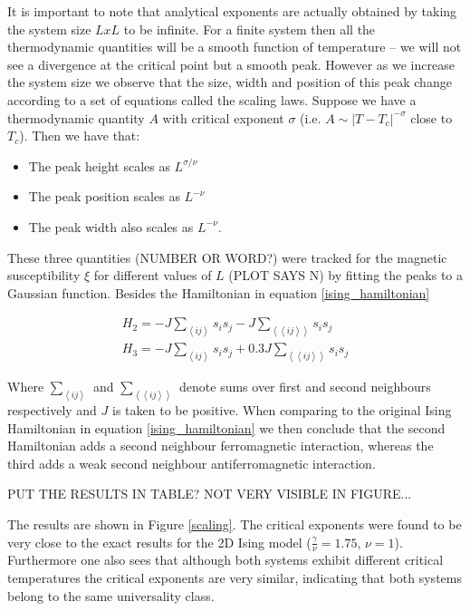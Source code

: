 \documentclass[twoside]{article}
\def\mean#1{\left< #1 \right>}
\begin{document}
\begin{multicols}{2}
It is important to note that analytical exponents are actually obtained by taking the system size $LxL$ to be infinite. For a finite system then all the thermodynamic quantities will be a smooth function of temperature -- we will not see a divergence at the critical point but a smooth peak. However as we increase the system size we observe that the size, width and position of this peak change according to a set of equations called the scaling laws. Suppose we have a thermodynamic quantity $A$ with critical exponent $\sigma$ (i.e. $A \sim |T-T_c|^{-\sigma}$ close to $T_c$). Then we have that:

\begin{itemize}
\item The peak height scales as $L^{\sigma/\nu}$
\item The peak position scales as $L^{-\nu}$
\item The peak width also scales as $L^{-\nu}$.
\end{itemize}

These three quantities (NUMBER OR WORD?) were tracked for the magnetic susceptibility $\xi$ for different values of $L$ (PLOT SAYS N) by fitting the peaks to a Gaussian function. Besides the Hamiltonian in equation \eqref{ising_hamiltonian}

\begin{align}
\label{second_neigh_hamil}
H_2 = -J\sum_{\mean{ij}} s_i s_j  -J\sum_{\mean{\mean{ij}}} s_i s_j \\
\label{anti_hamil}
H_3 = -J\sum_{\mean{ij}} s_i s_j + 0.3 J \sum_{\mean{\mean{ij}}} s_i s_j 
\end{align}

Where $\sum_{\mean{ij}}$ and $\sum_{\mean{\mean{ij}}}$ denote sums over first and second neighbours respectively and $J$ is taken to be positive. When comparing to the original Ising Hamiltonian in equation \eqref{ising_hamiltonian} we then conclude that the second Hamiltonian adds a second neighbour ferromagnetic interaction, whereas the third adds a weak second neighbour antiferromagnetic interaction.

PUT THE RESULTS IN TABLE? NOT VERY VISIBLE IN FIGURE...

The results are shown in Figure \ref{scaling}. The critical exponents were found to be very close to the exact results for the 2D Ising model ($\frac{\gamma}{\nu} = 1.75$, $\nu = 1$). Furthermore one also sees that although both systems exhibit different critical temperatures the critical exponents are very similar, indicating that both systems belong to the same universality class.


\end{multicols}
\end{document}
